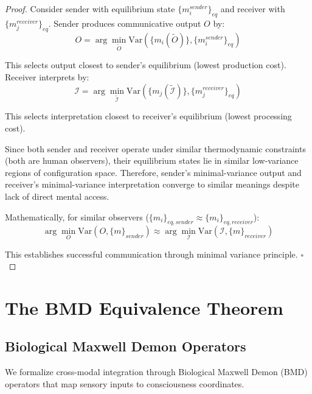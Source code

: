 \documentclass[12pt]{article}
\theoremstyle{definition}
\theoremstyle{remark}
\begin{document}
\begin{proof}
Consider sender with equilibrium state $\{m_i^{sender}\}_{eq}$ and receiver with $\{m_j^{receiver}\}_{eq}$. Sender produces communicative output $O$ by:
\begin{equation}
O = \arg\min_{\tilde{O}} \text{Var}(\{m_i(\tilde{O})\}, \{m_i^{sender}\}_{eq})
\end{equation}

This selects output closest to sender's equilibrium (lowest production cost). Receiver interprets by:
\begin{equation}
\mathcal{I} = \arg\min_{\tilde{\mathcal{I}}} \text{Var}(\{m_j(\tilde{\mathcal{I}})\}, \{m_j^{receiver}\}_{eq})
\end{equation}

This selects interpretation closest to receiver's equilibrium (lowest processing cost).

Since both sender and receiver operate under similar thermodynamic constraints (both are human observers), their equilibrium states lie in similar low-variance regions of configuration space. Therefore, sender's minimal-variance output and receiver's minimal-variance interpretation converge to similar meanings despite lack of direct mental access.

Mathematically, for similar observers ($\{m_i\}_{eq,sender} \approx \{m_i\}_{eq,receiver}$):
\begin{equation}
\arg\min_{O} \text{Var}(O, \{m\}_{sender}) \approx \arg\min_{\mathcal{I}} \text{Var}(\mathcal{I}, \{m\}_{receiver})
\end{equation}

This establishes successful communication through minimal variance principle. $\square$
\end{proof}

\section{The BMD Equivalence Theorem}
\label{sec:bmd_equivalence}

\subsection{Biological Maxwell Demon Operators}

We formalize cross-modal integration through Biological Maxwell Demon (BMD) operators that map sensory inputs to consciousness coordinates.
\end{document}
